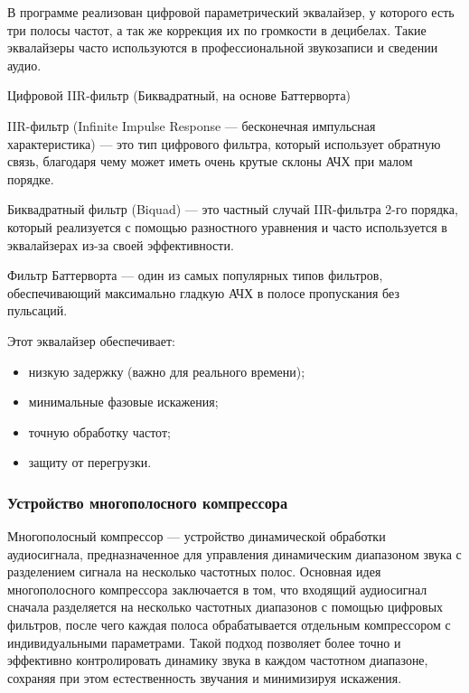 В программе реализован цифровой параметрический эквалайзер, у которого есть три полосы частот, а так же коррекция их по громкости в децибелах. Такие эквалайзеры часто используются в профессиональной звукозаписи и сведении аудио.

Цифровой IIR-фильтр (Биквадратный, на основе Баттерворта)

IIR-фильтр (Infinite Impulse Response — бесконечная импульсная характеристика) — это тип цифрового фильтра, который использует обратную связь, благодаря чему может иметь очень крутые склоны АЧХ при малом порядке.

Биквадратный фильтр (Biquad) — это частный случай IIR-фильтра 2-го порядка, который реализуется с помощью разностного уравнения и часто используется в эквалайзерах из-за своей эффективности.

Фильтр Баттерворта — один из самых популярных типов фильтров, обеспечивающий максимально гладкую АЧХ в полосе пропускания без пульсаций.

Этот эквалайзер обеспечивает:
\begin{itemize}
	\item низкую задержку (важно для реального времени);
	\item минимальные фазовые искажения;
	\item точную обработку частот;
	\item защиту от перегрузки.
\end{itemize}

\subsubsection{Устройство многополосного компрессора}

Многополосный компрессор — устройство динамической обработки аудиосигнала, предназначенное для управления динамическим диапазоном звука с разделением сигнала на несколько частотных полос. Основная идея многополосного компрессора заключается в том, что входящий аудиосигнал сначала разделяется на несколько частотных диапазонов с помощью цифровых фильтров, после чего каждая полоса обрабатывается отдельным компрессором с индивидуальными параметрами. Такой подход позволяет более точно и эффективно контролировать динамику звука в каждом частотном диапазоне, сохраняя при этом естественность звучания и минимизируя искажения.

